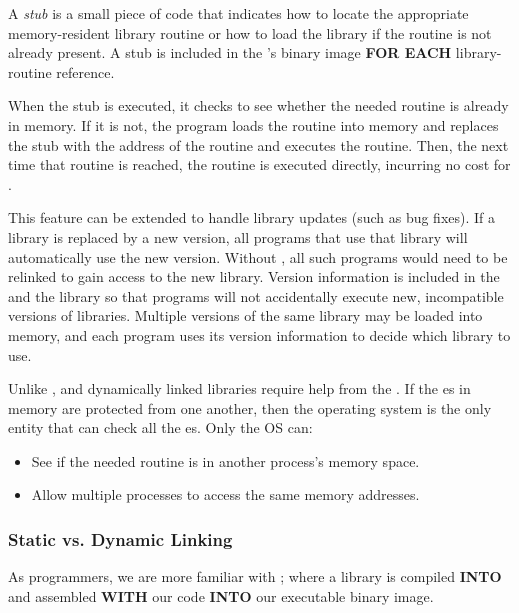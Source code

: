 \begin{definition}[Stub]\label{def:Stub}
  A \emph{stub} is a small piece of code that indicates how to locate the appropriate memory-resident library routine or how to load the library if the routine is not already present.
  A stub is included in the 's binary image \textbf{FOR EACH} library-routine reference.

  When the stub is executed, it checks to see whether the needed routine is already in memory.
  If it is not, the program loads the routine into memory and replaces the stub with the address of the routine and executes the routine.
  Then, the next time that routine is reached, the routine is executed directly, incurring no cost for .
\end{definition}

This feature can be extended to handle library updates (such as bug fixes).
If a library is replaced by a new version, all programs that use that library will automatically use the new version.
Without , all such programs would need to be relinked to gain access to the new library.
Version information is included in the  and the library so that programs will not accidentally execute new, incompatible versions of libraries.
Multiple versions of the same library may be loaded into memory, and each program uses its version information to decide which library to use.

Unlike ,  and dynamically linked libraries require help from the .
If the es in memory are protected from one another, then the operating system is the only entity that can check all the es.
Only the OS can:
\begin{itemize}[noitemsep]
\item See if the needed routine is in another process’s memory space.
\item Allow multiple processes to access the same memory addresses.
\end{itemize}

\subsubsection{Static vs. Dynamic Linking}\label{subsubsec:Static_vs_Dynamic_Linking}
As programmers, we are more familiar with ; where a library is compiled \textbf{INTO} and assembled \textbf{WITH} our code \textbf{INTO} our executable binary image.

